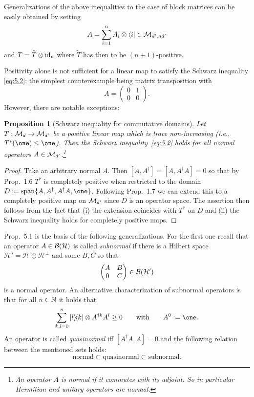 \documentclass[11pt,a4paper]{article}
\theoremstyle{plain}
\newtheorem{proposition}{Proposition}[section]
\theoremstyle{definition}
\theoremstyle{remark}
\numberwithin{equation}{section}
\begin{document}
Generalizations of the above inequalities to the case of block matrices can be easily
obtained by setting
\[
    A=\sum_{i=1}^n A_i\otimes \langle i| \in \mathcal{M}_{d',nd'}
\]
and $T=\widetilde T\otimes \mathrm{id}_n$ where $\widetilde T$ has then to be
$(n+1)$-positive.

Positivity alone is not sufficient for a linear map to satisfy the Schwarz inequality
\eqref{eq:5.2}; the simplest counterexample being matrix transposition with
\[
    A=\begin{pmatrix}0 & 1 \\ 0 & 0\end{pmatrix}.
\]
However, there are notable exceptions:

\begin{proposition}[Schwarz inequality for commutative domains]
    Let $T:\mathcal{M}_d \to \mathcal{M}_{d'}$ be a positive linear map which is trace non-increasing
    (i.e., $T^*(\one)\le \one$). Then the Schwarz inequality~\eqref{eq:5.2} holds for all
    normal operators $A\in \mathcal{M}_{d'}$.\footnote{An operator $A$ is normal if it commutes
        with its adjoint. So in particular Hermitian and unitary operators are normal.}
\end{proposition}

\begin{proof}
    Take an arbitrary normal $A$. Then $[A,A^\dagger]=[A,A^\dagger A]=0$ so that by
    Prop.~1.6 $T^*$ is completely positive when restricted to the domain
    $D:=\spn\{A,A^\dagger,A^\dagger A,\one\}$. Following Prop.~1.7 we can extend this to
    a completely positive map on $\mathcal{M}_{d'}$ since $D$ is an operator space. The
    assertion then follows from the fact that (i) the extension coincides with $T^*$ on $D$
    and (ii) the Schwarz inequality holds for completely positive maps.
\end{proof}

Prop.~5.1 is the basis of the following generalizations. For the first one recall that
an operator $A\in \mathcal{B}(\mathcal{H})$ is called \emph{subnormal} if there is a Hilbert
space $\mathcal{H}'=\mathcal{H}\oplus \mathcal{H}^\perp$ and some $B,C$ so that
\[
    \begin{pmatrix}
        A &B\\
        0 &C
    \end{pmatrix} \in \mathcal{B}(\mathcal{H}')
\]
is a normal operator. An alternative characterization of subnormal operators is that
for all $n\in \mathbb{N}$ it holds that
\[
    \sum_{k,l=0}^n \ketbra{l}{k}\otimes A^{\dagger k}A^l \ge 0
    \qquad\text{with}\qquad A^0:=\one.
\]
An operator is called \emph{quasinormal} iff $[A^\dagger A,A]=0$ and the following
relation between the mentioned sets holds:
\[
    \text{normal} \subset \text{quasinormal} \subset \text{subnormal}.
\]
\end{document}
